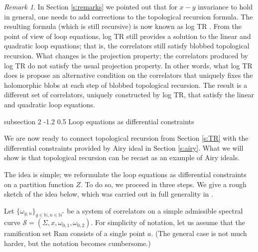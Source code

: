 \documentclass[reqno,oneside,11pt]{amsart}
\makeatletter
\theoremstyle{plain}
\theoremstyle{definition}
\theoremstyle{remark}
\newtheorem{remark}[theorem]{Remark}
\numberwithin{equation}{section}
\renewcommand{\subsection}{\@startsection
{subsection}%
{2}%
{\z@}%
{-1.2\baselineskip}%
{0.5\baselineskip}%
{\normalfont \bf \normalsize}} %
\newcommand{\Ra}{\text{Ram}}
\makeatother
\begin{document}
\begin{remark}
In Section \ref{s:remarks} we pointed out that for $x-y$ invariance to hold in general, one needs to add corrections to the topological recursion formula. The resulting formula (which is still recursive) is now known as log TR \cite{ABDKS23}. From the point of view of loop equations, log TR still provides a solution to the linear and quadratic loop equations; that is, the correlators still satisfy blobbed topological recursion. What changes is the projection property; the correlators produced by log TR do not satisfy the usual projection property. In other words, what log TR does is propose an alternative condition on the correlators that uniquely fixes the holomorphic blobs at each step of blobbed topological recursion. The result is a different set of correlators, uniquely constructed by log TR, that satisfy the linear and quadratic loop equations.
\end{remark}


\subsection{Loop equations as differential constraints}

We are now ready to connect topological recursion from Section \ref{s:TR} with the differential constraints provided by Airy ideal in Section \ref{s:airy}. What we will show is that topological recursion can be recast as an example of Airy ideals.

The idea is simple; we reformulate the loop equations as differential constraints on a partition function $Z$. To do so, we proceed in three steps. We give a rough sketch of the idea below, which was carried out in full generality in \cite{BBCCN18}.

Let $\{\omega_{g,n} \}_{g \in \mathbb{N}, n \in \mathbb{N}^* }$ be a system of correlators on a simple admissible spectral curve $\mathcal{S} = (\Sigma,x,\omega_{0,1}, \omega_{0,2})$.  For simplicity of notation, let us assume that the ramification set $\Ra$ consists of a single point $a$. (The general case is not much harder, but the notation becomes cumbersome.)
\end{document}
